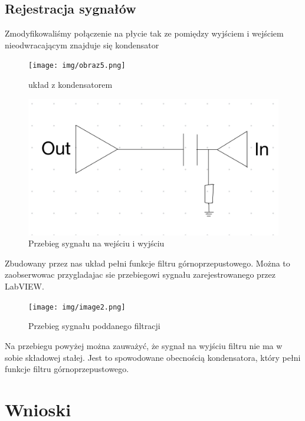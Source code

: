 \documentclass[11pt]{article}
\begin{document}
\subsection{Rejestracja sygnałów}
Zmodyfikowaliśmy połączenie na płycie tak ze pomiędzy wyjściem i wejściem nieodwracającym znajduje się kondensator 

\begin{figure}[H]
    \centering
    \texttt{[image: img/obraz5.png]}
    \caption{układ z kondensatorem}
    \label{fig:placeholder}
\end{figure}

\begin{figure}[H]
    \centering
    \includegraphics[width=0.5\linewidth]{img/image.png}
    \caption{Przebieg sygnału na wejściu i wyjściu}
    \label{fig:placeholder}
\end{figure}

Zbudowany przez nas układ pełni funkcje filtru górnoprzepustowego. Można to zaobserwowac przygladajac sie przebiegowi sygnału zarejestrowanego przez 
LabVIEW.

\begin{figure}[H]
    \centering
    \texttt{[image: img/image2.png]}
    \caption{Przebieg sygnału poddanego filtracji}
    \label{fig:placeholder}
\end{figure}

Na przebiegu powyżej można zauważyć, że sygnał na wyjściu filtru nie ma w sobie składowej stałej. Jest to spowodowane obecnością kondensatora, który pełni funkcje filtru górnoprzepustowego.

\section{Wnioski}
\end{document}
